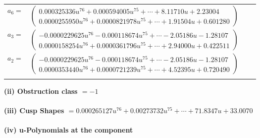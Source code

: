 \documentclass[1p]{elsarticle_modified}
\theoremstyle{definition}
\begin{document}
\begin{tabular}{m{7pt} m{180pt} m{7pt} m{180pt} }
\flushright $a_{6}=$&$\begin{pmatrix}0.000325336 u^{76}+0.000594005 u^{75}+\cdots+8.11710 u+2.23004\\0.0000255950 u^{76}+0.0000821978 u^{75}+\cdots+1.91504 u+0.601280\end{pmatrix}$ \\
\flushright $a_{3}=$&$\begin{pmatrix}-0.0000229625 u^{76}-0.000118674 u^{75}+\cdots-2.05186 u-1.28107\\0.0000158254 u^{76}+0.0000361796 u^{75}+\cdots+2.94000 u+0.422511\end{pmatrix}$ \\
\flushright $a_{2}=$&$\begin{pmatrix}-0.0000229625 u^{76}-0.000118674 u^{75}+\cdots-2.05186 u-1.28107\\0.0000353440 u^{76}+0.0000721239 u^{75}+\cdots+4.52395 u+0.720490\end{pmatrix}$\\&\end{tabular}
\flushleft \textbf{(ii) Obstruction class $= -1$}\\~\\
\flushleft \textbf{(iii) Cusp Shapes $= 0.000265127 u^{76}+0.00273732 u^{75}+\cdots+71.8347 u+33.0070$}\\~\\
\newpage\renewcommand{\arraystretch}{1}
\flushleft \textbf{(iv) u-Polynomials at the component}\newline \\
\end{document}
